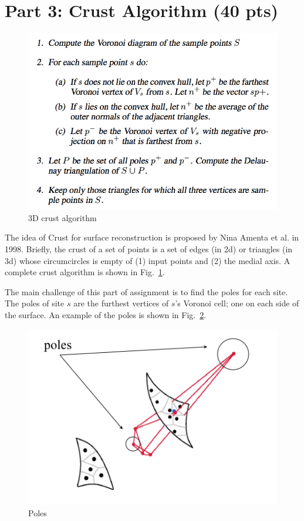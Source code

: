 \documentclass[11pt]{article}
\begin{document}
\section{Part 3: Crust Algorithm (40 pts)}


\begin{figure}[ht]
\centering
\includegraphics[width=.5\textwidth]{FIGS/crust-alg}
\caption{3D crust algorithm}
\label{alg:crust-alg}
\end{figure}

The idea of Crust for surface reconstruction is proposed by Nina Amenta et al. \cite{abk-anvra-98} in 1998.
Briefly, the crust of a set of points is a set of edges (in 2d) or triangles (in 3d) whose circumcircles is empty of
(1) input points and (2) the medial axis.  A complete crust algorithm is shown in Fig.~\ref{alg:crust-alg}.


The main challenge of this part of assignment is to find the poles for each site. The poles
of site $s$ are the furthest vertices of $s$'s Voronoi cell; one on each side of the surface. 
An example of the poles is shown in Fig.~\ref{fig:crust-pole}.


\begin{figure}[ht]
\centering
\begin{minipage}[t]{0.5\linewidth}
\includegraphics[width=\textwidth]{FIGS/crust-pole}
\caption{Poles}
\label{fig:crust-pole}
\end{minipage}
\end{figure}
\end{document}
